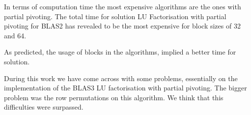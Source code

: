 \documentclass[conference,compsoc]{IEEEtran}
\begin{document}
In terms of computation time the most expensive algorithms are the ones with partial pivoting. The total time for solution LU Factorisation with partial pivoting for BLAS2 has revealed to be the most expensive for block sizes of 32 and 64. \par 

As predicted, the usage of blocks in the algorithms, implied a better time for solution. \par

During this work we have come across with some problems, essentially on the implementation of the BLAS3 LU factorisation with partial pivoting. The bigger problem was the row permutations on this algorithm. We think that this difficulties were surpassed.


\nocite{*}


	

\end{document}
